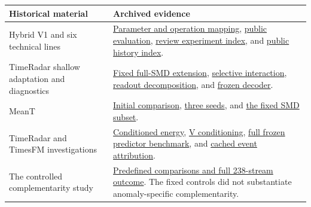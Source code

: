 \documentclass[
  american,
]{article}
\begin{document}
\begin{longtable}[]{@{}
  >{\raggedright\arraybackslash}p{}
  >{\raggedright\arraybackslash}p{}@{}}
\toprule\noalign{}
\begin{minipage}[b]{\linewidth}\raggedright
Historical material
\end{minipage} & \begin{minipage}[b]{\linewidth}\raggedright
Archived evidence
\end{minipage} \\
\midrule\noalign{}
\endhead
\bottomrule\noalign{}
\endlastfoot
Hybrid V1 and six technical lines &
\href{../../docs/hybrid_v1/paper_module_map.md}{Parameter and operation
mapping}, \href{../../docs/hybrid_v1/public_evaluation.md}{public
evaluation}, \href{../../review_artifacts/EXPERIMENT_INDEX.md}{review
experiment index}, and
\href{../../docs/provenance/history_index.md}{public history index}. \\
TimeRadar shallow adaptation and diagnostics &
\href{../../docs/experiments/timeradar_smd_full_left_matched_20261116/RESULTS.md}{Fixed
full-SMD extension},
\href{../../docs/experiments/timeradar_selective_context_20261116/RESULTS.md}{selective
interaction},
\href{../../docs/experiments/timeradar_error_decomposition_20261117/RESULTS.md}{readout
decomposition}, and
\href{../../docs/experiments/timeradar_adapter_only_20261117/RESULTS.md}{frozen
decoder}. \\
MeanT &
\href{../../docs/experiments/timeradar_target_mean_20261120/RESULTS.md}{Initial
comparison},
\href{../../docs/experiments/timeradar_target_mean_repeat_20261120/RESULTS.md}{three
seeds}, and
\href{../../docs/experiments/timeradar_target_mean_smd_20261120/RESULTS.md}{the
fixed SMD subset}. \\
TimeRadar and TimesFM investigations &
\href{../../docs/experiments/tf_conditional_energy_20261119/RESULTS.md}{Conditioned
energy},
\href{../../docs/experiments/timeradar_native_v_conditioning_20261119/RESULTS.md}{V
conditioning},
\href{../../docs/experiments/timesfm3_frozen_20261121/RESULTS.md}{full
frozen predictor benchmark}, and
\href{../../docs/experiments/timesfm3_v_cached_attribution_20261121/RESULTS.md}{cached
event attribution}. \\
The controlled complementarity study &
\href{../../docs/experiments/controlled_complementarity_20261121/RESULTS.md}{Predefined
comparisons and full 238-stream outcome}. The fixed controls did not
substantiate anomaly-specific complementarity. \\

\end{longtable}
\end{document}
